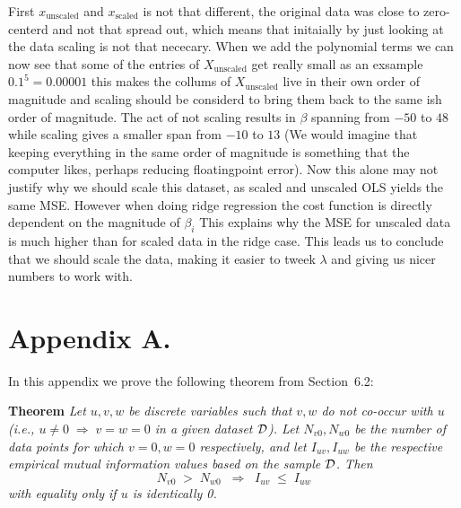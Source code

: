 \documentclass[twoside,11pt]{report}
\newcommand{\dataset}{{\cal D}}
\begin{document}
First $x_{\text{unscaled}}$ and $x_{\text{scaled}}$ is not that different, the original data was close to zero-centerd and not that spread out, which means that initaially by just looking at the data scaling is not that nececary. When we add the polynomial terms we can now see that some of the entries of $X_{\text{unscaled}}$ get really small as an exsample $0.1^5 = 0.00001$ this makes the collums of $X_{\text{unscaled}}$ live in their own order of magnitude and scaling should be considerd to bring them back to the same ish order of magnitude. The act of not scaling results in $\beta$ spanning from $-50$ to $48$ while scaling gives a smaller span from $-10$ to $13$ (We would imagine that keeping everything in the same order of magnitude is something that the computer likes, perhaps reducing floatingpoint error). Now this alone may not justify why we should scale this dataset, as scaled and unscaled OLS yields the same MSE. However when doing ridge regression the cost function is directly dependent on the magnitude of $\beta_i$ This explains why the MSE for unscaled data is much higher than for scaled data in the ridge case.  
This leads us to conclude that we should scale the data, making it easier to tweek $\lambda$ and giving us nicer numbers to work with.
\footnotemark[\value{footnote}]




\newpage

\appendix
\section*{Appendix A.}
\label{app:theorem}



In this appendix we prove the following theorem from
Section~6.2:

\noindent
{\bf Theorem} {\it Let $u,v,w$ be discrete variables such that $v, w$ do
not co-occur with $u$ (i.e., $u\neq0\;\Rightarrow \;v=w=0$ in a given
dataset $\dataset$). Let $N_{v0},N_{w0}$ be the number of data points for
which $v=0, w=0$ respectively, and let $I_{uv},I_{uw}$ be the
respective empirical mutual information values based on the sample
$\dataset$. Then
\[
	N_{v0} \;>\; N_{w0}\;\;\Rightarrow\;\;I_{uv} \;\leq\;I_{uw}
\]
with equality only if $u$ is identically 0.} \hfill\BlackBox
\end{document}
